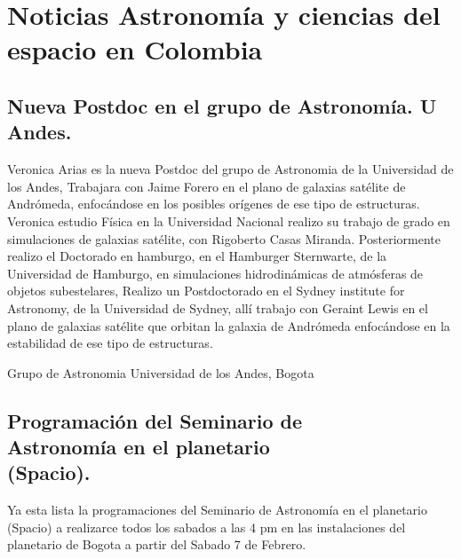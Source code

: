 \documentclass{book}
\begin{document}
\tableofcontents{}


\newpage


\renewcommand\thesection{\arabic{section}}
\renewcommand\thesubsection{\arabic{subsection}}

 \section*{Noticias Astronomía y
    ciencias del espacio en Colombia}

\subsection{Nueva Postdoc en el grupo de Astronomía. U Andes.}

Veronica Arias es la nueva Postdoc del grupo de Astronomia de la Universidad de los Andes, Trabajara con Jaime Forero en el plano de galaxias satélite de Andrómeda, enfocándose en los posibles orígenes de ese tipo de estructuras. Veronica estudio Física en la Universidad Nacional realizo su trabajo de grado en simulaciones de galaxias satélite, con Rigoberto Casas Miranda. Posteriormente realizo el Doctorado en hamburgo, en el Hamburger Sternwarte, de la Universidad de Hamburgo, en simulaciones hidrodinámicas de atmósferas de objetos subestelares, Realizo un Postdoctorado en el Sydney institute for Astronomy, de la Universidad de Sydney, allí trabajo con Geraint Lewis en el plano de galaxias satélite que orbitan la galaxia de Andrómeda enfocándose en la estabilidad de ese tipo de estructuras.\\

\begin{flushright}
Grupo de Astronomia Universidad de los Andes, Bogota
\end{flushright}

\subsection{Programación del Seminario de\\ Astronomía en el planetario\\ (Spacio).}

Ya esta lista la programaciones del Seminario de Astronomía en el planetario (Spacio) a realizarce todos los sabados a las 4 pm en las instalaciones del planetario de Bogota a partir del Sabado 7 de Febrero.\\
\end{document}
